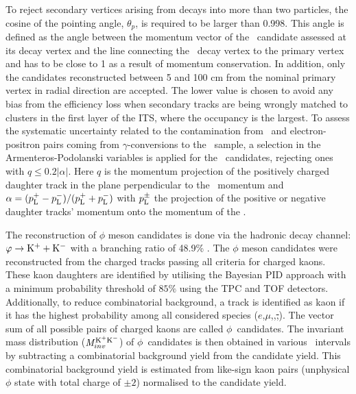 \documentclass[ALICE,manyauthors]{cernphprep}
\providecommand{\DIFaddtex}[1]{{\protect\color{blue}\uwave{#1}}} %
\providecommand{\DIFdeltex}[1]{{\protect\color{red}\sout{#1}}}                      %
\providecommand{\DIFaddbegin}{} %
\providecommand{\DIFaddend}{} %
\providecommand{\DIFdelbegin}{} %
\providecommand{\DIFdelend}{} %
\providecommand{\DIFadd}[1]{\texorpdfstring{\DIFaddtex{#1}}{#1}} %
\providecommand{\DIFdel}[1]{\texorpdfstring{\DIFdeltex{#1}}{}} %
\newcommand{\DIFscaledelfig}{0.5}
\newlength{\DIFdelgraphicswidth} %
\newlength{\DIFdelgraphicsheight} %
\newcommand{\DIFaddincludegraphics}[2][]{{\color{blue}\fbox{\DIFOincludegraphics[#1]{#2}}}} %
\newcommand{\DIFdelincludegraphics}[2][]{%
\sbox{\DIFdelgraphicsbox}{\DIFOincludegraphics[#1]{#2}}%
\settoboxwidth{\DIFdelgraphicswidth}{\DIFdelgraphicsbox} %
\settoboxtotalheight{\DIFdelgraphicsheight}{\DIFdelgraphicsbox} %
\scalebox{\DIFscaledelfig}{%
\parbox[b]{\DIFdelgraphicswidth}{\usebox{\DIFdelgraphicsbox}\\[-\baselineskip] \rule{\DIFdelgraphicswidth}{0em}}\llap{\resizebox{\DIFdelgraphicswidth}{\DIFdelgraphicsheight}{%
\setlength{\unitlength}{\DIFdelgraphicswidth}%
\begin{picture}(1,1)%
\thicklines\linethickness{2pt} %
{\color[rgb]{1,0,0}\put(0,0){\framebox(1,1){}}}%
{\color[rgb]{1,0,0}\put(0,0){\line( 1,1){1}}}%
{\color[rgb]{1,0,0}\put(0,1){\line(1,-1){1}}}%
\end{picture}%
}\hspace*{3pt}}} %
} %
\DeclareRobustCommand{\DIFaddbegin}{\DIFOaddbegin \let\includegraphics\DIFaddincludegraphics} %
\DeclareRobustCommand{\DIFaddend}{\DIFOaddend \let\includegraphics\DIFOincludegraphics} %
\DeclareRobustCommand{\DIFdelbegin}{\DIFOdelbegin \let\includegraphics\DIFdelincludegraphics} %
\DeclareRobustCommand{\DIFdelend}{\DIFOaddend \let\includegraphics\DIFOincludegraphics} %
\begin{document}
To reject secondary vertices arising from decays into more than two particles, the cosine of the pointing angle, $\theta_{p}$, is required to be larger than 0.998. This angle is defined as the angle between the momentum vector of the \vo~candidate assessed at its decay vertex and the line connecting the \vo~decay vertex to the primary vertex and has to be close to 1 as a result of momentum conservation. In addition, only the candidates reconstructed between 5 and 100 cm from the nominal primary vertex in radial direction are accepted. The lower value is chosen to avoid any bias from the efficiency loss when secondary tracks are being wrongly matched to clusters in the first layer of the ITS, where the occupancy is the largest. To assess the systematic uncertainty related to the contamination from \lambdas~and electron-positron pairs coming from $\gamma$-conversions to the \Ks~sample, a selection in the Armenteros-Podolanski variables \cite{doi:10.1080/14786440108520416} is applied for the \Ks~candidates, rejecting ones with $q\le 0.2|\alpha|$. Here $q$ is the momentum projection of the positively charged daughter track in the plane perpendicular to the \vo~momentum and $\alpha = (p_{\rm{L}}^{+} - p_{\rm{L}}^{-})/(p_{\rm{L}}^{+} + p_{\rm{L}}^{-})$ with $p_{\rm{L}}^{\pm}$ the projection of the positive or negative daughter tracks' momentum onto the momentum of the
\vo.


The reconstruction of $\phi$ meson candidates is done via the hadronic decay channel: $\varphi \rightarrow {\rm K}^{+} + {\rm K}^{-}$ with a branching ratio of 48.9\% \cite{Olive_2016}. The $\phi$ meson candidates were reconstructed from the charged tracks passing all criteria for charged kaons. These kaon daughters are identified by utilising the Bayesian PID approach \cite{Adam:2016acv} with a minimum probability threshold of $85\%$ using the TPC and TOF detectors. Additionally, to reduce combinatorial background, a track is identified as kaon if it has the highest probability among all considered species ($e$,\DIFaddbegin \DIFadd{~}\DIFaddend $\mu$,\DIFaddbegin \DIFadd{~}\DIFaddend \pion,\DIFaddbegin \DIFadd{~}\DIFaddend \kaon\DIFdelbegin \DIFdel{,}\DIFdelend \DIFaddbegin \DIFadd{~and }\DIFaddend \proton). The vector sum of all possible pairs of charged kaons are called $\phi$~candidates. The invariant mass distribution (\DIFdelbegin \DIFdel{${\it M}_{inv}^{\rm K^{+}K^{-}}$}\DIFdelend \DIFaddbegin \DIFadd{${\it M}_{\rm inv}^{\rm K^{+}K^{-}}$}\DIFaddend ) of $\phi$~candidates is then obtained in various \pT~intervals by subtracting a combinatorial background yield from the candidate yield. This combinatorial background yield is estimated from like-sign kaon pairs (unphysical $\phi$ state with total charge of $\pm2$) normalised to the candidate yield. 
\end{document}
